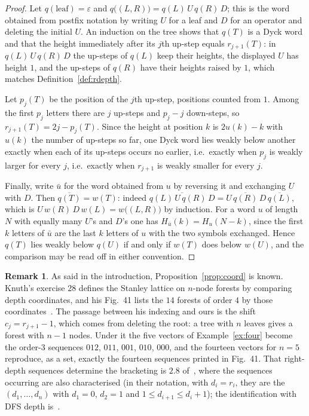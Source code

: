 \documentclass[11pt,a4paper]{article}
\theoremstyle{plain}
\theoremstyle{definition}
\newtheorem{remark}[theorem]{Remark}
\begin{document}
\begin{proof}
Let $q(\text{leaf})=\varepsilon$ and $q\bigl((L,R)\bigr)=q(L)\,U\,q(R)\,D$; this is the
word obtained from postfix notation by writing $U$ for a leaf and $D$ for an operator
and deleting the initial $U$. An induction on the tree shows that $q(T)$ is a Dyck word
and that the height immediately after its $j$th up-step equals $r_{j+1}(T)$: in
$q(L)\,U\,q(R)\,D$ the up-steps of $q(L)$ keep their heights, the displayed $U$ has
height $1$, and the up-steps of $q(R)$ have their heights raised by $1$, which matches
Definition~\ref{def:rdepth}.

Let $p_j(T)$ be the position of the $j$th up-step, positions counted from $1$. Among the
first $p_j$ letters there are $j$ up-steps and $p_j-j$ down-steps, so
$r_{j+1}(T)=2j-p_j(T)$. Since the height at position $k$ is $2u(k)-k$ with $u(k)$ the
number of up-steps so far, one Dyck word lies weakly below another exactly when each of
its up-steps occurs no earlier, i.e.\ exactly when $p_j$ is weakly larger for every $j$,
i.e.\ exactly when $r_{j+1}$ is weakly smaller for every $j$.

Finally, write $\bar u$ for the word obtained from $u$ by reversing it and exchanging
$U$ with $D$. Then $\overline{q(T)}=w(T)$: indeed
$\overline{q(L)\,U\,q(R)\,D}=U\,\overline{q(R)}\,D\,\overline{q(L)}$, which is
$U\,w(R)\,D\,w(L)=w\bigl((L,R)\bigr)$ by induction. For a word $u$ of length $N$ with
equally many $U$'s and $D$'s one has $H_{\bar u}(k)=H_u(N-k)$, since the first $k$
letters of $\bar u$ are the last $k$ letters of $u$ with the two symbols exchanged.
Hence $q(T)$ lies weakly below $q(U)$ if and only if $w(T)$ does below $w(U)$, and the
comparison may be read off in either convention.
\end{proof}

\begin{remark}\label{rem:coordknown}
As said in the introduction, Proposition~\ref{prop:coord} is known. Knuth's exercise 28
defines the Stanley lattice on $n$-node forests by comparing depth coordinates, and his
Fig.~41 lists the $14$ forests of order $4$ by those coordinates~\cite{Knuth}. The
passage between his indexing and ours is the shift $c_j=r_{j+1}-1$, which comes from
deleting the root: a tree with $n$ leaves gives a forest with $n-1$ nodes. Under it the
five vectors of Example~\ref{ex:four} become the order-$3$ sequences $012$, $011$,
$001$, $010$, $000$, and the fourteen vectors for $n=5$ reproduce, as a set, exactly the
fourteen sequences printed in Fig.~41. That right-depth sequences determine the bracketing is
$2.8$ of~\cite{CsW}, where the sequences occurring are also characterised (in their
notation, with $d_i=r_i$, they are the $(d_1,\dots,d_n)$ with $d_1=0$, $d_2=1$ and
$1\le d_{i+1}\le d_i+1$); the identification
with DFS depth is~\cite[\S2.5]{LW}.
\end{remark}
\end{document}
